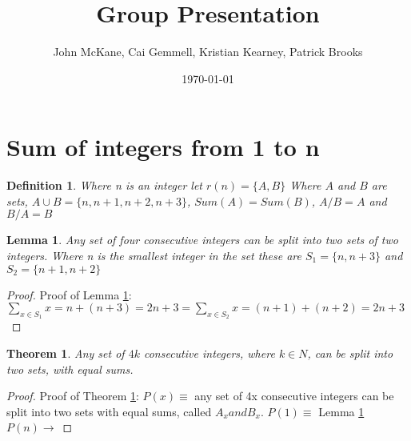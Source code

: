 \documentclass{beamer}
\author{John McKane, Cai Gemmell, Kristian Kearney, Patrick Brooks}
\title{Group Presentation}
\institute{Queen's University Belfast }
\date{\today}
\newtheorem{theorem}{Theorem}
\newtheorem{proof}{Proof}
\newtheorem{deff}{Definition}
\newtheorem{lemm}{Lemma}
\newcommand{\tH}[1]{Theorem \ref{#1}}
\newcommand{\lE}[1]{Lemma \ref{#1}}
\newcommand{\uni}{\cup}
\begin{document}
	\begin{frame}
    \titlepage
    \end{frame}

	
	\begin{frame}
		\tableofcontents[sectionstyle=show,subsectionstyle=show/shaded/hide,subsubsectionstyle=show/shaded/hide]
	\end{frame}
		
	
	\section{Sum of integers from 1 to n}
	    \begin{frame}
	        \begin{deff}
	                Where n is an integer let $r(n) = \{A,B\}$ Where $A$ and $B$ are sets, $A \uni B = \{n,n+1,n+2,n+3\}$, $Sum(A) = Sum(B)$, $A/B = A$ and $B/A=B$
	        \end{deff}
	    \end{frame}
		    \begin{frame}
\begin{lemm}
	\label{stn}
	Any set of four consecutive integers can be split into two sets of two integers. Where n is the smallest integer in the set these are $S_1 =\{n,n+3\}$ and $S_2 = \{n+1,n+2\}$
\end{lemm}
\begin{proof}
	Proof of \lE{stn}:
	\begin{math}
		\sum_{x \in S_1} x = n+(n+3) = 2n+3
		= \sum_{x \in S_2} x = (n+1)+(n+2) = 2n+3 
	\end{math}
\end{proof}
		    \end{frame}
\begin{frame}
	\begin{theorem}
	\label{4kn}
	Any set of $4k$ consecutive integers, where $k \in N$, can be split into two sets, with equal sums.
	\end{theorem}	        
	\begin{proof}
	            Proof of \tH{4kn}:
	            $P(x) \equiv$ any set of 4x consecutive integers can be split into two sets with equal sums, called $A_x and B_x$.
	            $P(1) \equiv$ \lE{stn}
	            \newline
	            $P(n) \rightarrow $
	\end{proof}
\end{frame}
	
\end{document}
